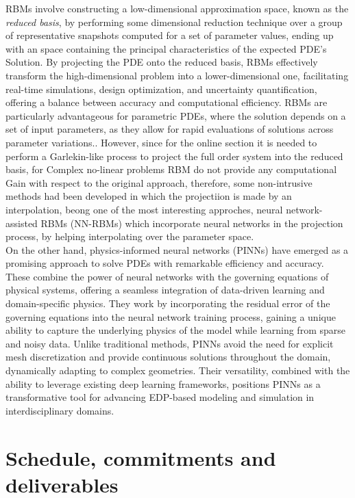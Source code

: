 \documentclass[12pt,letterpaper]{article}
\begin{document}
RBMs involve constructing a low-dimensional approximation space, known as the \textit{reduced basis}, by performing some dimensional reduction technique over a group of representative snapshots computed for a set of parameter values, ending up with an space containing the principal characteristics of the expected PDE's Solution\cite{benner2017model}. By projecting the PDE onto the reduced basis, RBMs effectively transform the high-dimensional problem into a lower-dimensional one, facilitating real-time simulations, design optimization, and uncertainty quantification, offering a balance between accuracy and computational efficiency. RBMs are particularly advantageous for parametric PDEs, where the solution depends on a set of input parameters, as they allow for rapid evaluations of solutions across parameter variations.\cite{quarteroni2015reduced}. However, since for the online section it is needed to perform a Garlekin-like process to project the full order system into the reduced basis, for Complex no-linear problems RBM do not provide any computational Gain with respect to the original approach, therefore, some non-intrusive methods had been developed in which the projectiion is made by an interpolation, beong one of the most interesting approches, neural network-assisted RBMs (NN-RBMs) which incorporate  neural networks in the projection process, by helping interpolating over the parameter space\cite{hesthaven2018non}. \\

On the other hand, physics-informed neural networks (PINNs) have emerged as a promising approach to solve PDEs with remarkable efficiency and accuracy. These combine the power of neural networks with the governing equations of physical systems, offering a seamless integration of data-driven learning and domain-specific physics. They work by incorporating the residual error of the governing equations into the neural network training process, gaining a unique ability to capture the underlying physics of the model while learning from sparse and noisy data. \cite{raissi2019physics} Unlike traditional methods, PINNs avoid the need for explicit mesh discretization and provide continuous solutions throughout the domain, dynamically adapting to complex geometries. Their versatility, combined with the ability to leverage existing deep learning frameworks, positions PINNs as a transformative tool for advancing EDP-based modeling and simulation in interdisciplinary domains.



\section{Schedule, commitments and deliverables}
\end{document}
